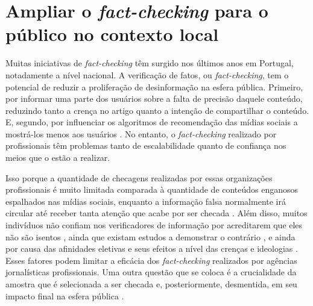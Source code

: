 \documentclass[portuguese]{textolivre}
\begin{document}
\section{Ampliar o \emph{fact-checking} para o público no contexto local}
Muitas iniciativas de \emph{fact-checking} têm surgido nos últimos anos em Portugal, notadamente a nível nacional. A verificação de fatos, ou \emph{fact-checking}, tem o potencial de reduzir a proliferação de desinformação na esfera pública. Primeiro, por informar uma parte dos usuários sobre a falta de precisão daquele conteúdo, reduzindo tanto a crença no artigo quanto a intenção de compartilhar o conteúdo. E, segundo, por influenciar os algoritmos de recomendação das mídias sociais a mostrá-los menos aos usuários \cite{allen_scaling_2021}. No entanto, o \emph{fact-checking} realizado por profissionais têm problemas tanto de escalabilidade quanto de confiança nos meios que o estão a realizar.

Isso porque a quantidade de checagens realizadas por essas organizações profissionais é muito limitada comparada à quantidade de conteúdos enganosos espalhados nas mídias sociais, enquanto a informação falsa normalmente irá circular até receber tanta atenção que acabe por ser checada \cite{prollochs_community-based_nodate}. Além disso, muitos indivíduos não confiam nos verificadores de informação por acreditarem que eles não são isentos \cite{allen_scaling_2021}, ainda que existam estudos a demonstrar o contrário \cite{baptista_elections_2022}, e ainda por causa das afinidades eletivas e seus efeitos a nível das crenças e ideologias \cite{zmigrod_cognitive_2021}. Esses fatores podem limitar a eficácia dos \emph{fact-checking} realizados por agências jornalísticas profissionais. Uma outra questão que se coloca é a crucialidade da amostra que é selecionada a ser checada e, posteriormente, desmentida, em seu impacto final na esfera pública \cite{drolsbach2022diffusion}.
\end{document}
